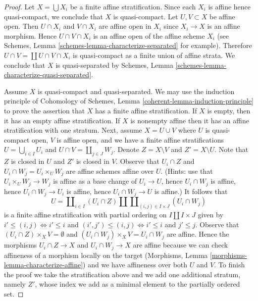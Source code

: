 \begin{proof}
Let $X = \bigcup X_i$ be a finite affine stratification. Since each $X_i$
is affine hence quasi-compact, we conclude that $X$ is quasi-compact.
Let $U, V \subset X$ be affine open. Then $U \cap X_i$ and $V \cap X_i$
are affine open in $X_i$ since $X_i \to X$ is an affine morphism. Hence
$U \cap V \cap X_i$ is an affine open of the affine scheme $X_i$ (see
Schemes, Lemma \ref{schemes-lemma-characterize-separated} for example).
Therefore $U \cap V = \coprod U \cap V \cap X_i$ is quasi-compact
as a finite union of affine strata. We conclude that $X$ is
quasi-separated by Schemes, Lemma
\ref{schemes-lemma-characterize-quasi-separated}.

\medskip\noindent
Assume $X$ is quasi-compact and quasi-separated. We may use the
induction principle of
Cohomology of Schemes, Lemma \ref{coherent-lemma-induction-principle}
to prove the assertion that $X$ has a finite affine stratification.
If $X$ is empty, then it has an empty affine stratification.
If $X$ is nonempty affine then it has an affine stratification
with one stratum. Next, assume $X = U \cup V$ where $U$ is quasi-compact open,
$V$ is affine open, and we have a finite affine stratifications
$U = \bigcup_{i \in I} U_i$ and $U \cap V = \coprod_{j \in J} W_j$.
Denote $Z = X \setminus V$ and $Z' = X \setminus U$.
Note that $Z$ is closed in $U$ and $Z'$ is closed in $V$.
Observe that $U_i \cap Z$ and $U_i \cap W_j = U_i \times_U W_j$ are affine
schemes affine over $U$. (Hints: use that $U_i \times_U W_j \to W_j$ is
affine as a base change of $U_i \to U$, hence $U_i \cap W_j$ is affine,
hence $U_i \cap W_j \to U_i$ is affine, hence $U_i \cap W_j \to U$ is affine.)
It follows that
$$
U = \coprod\nolimits_{i \in I} (U_i \cap Z) \amalg
\coprod\nolimits_{(i, j) \in I \times J} (U_i \cap W_j)
$$
is a finite affine stratification with partial ordering on
$I \amalg I \times J$ given by $i' \leq (i, j) \Leftrightarrow i' \leq i$
and $(i', j') \leq (i, j) \Leftrightarrow i' \leq i$ and $j' \leq j$.
Observe that $(U_i \cap Z) \times_X V = \emptyset$ and
$(U_i \cap W_j) \times_X V = U_i \cap W_j$ are affine.
Hence the morphisms $U_i \cap Z \to X$ and $U_i \cap W_j \to X$
are affine because we can check affineness of a morphism
locally on the target
(Morphisms, Lemma \ref{morphisms-lemma-characterize-affine})
and we have affineness over both $U$ and $V$.
To finish the proof we take the stratification above
and we add one additional stratum, namely $Z'$,
whose index we add as a minimal element to the partially ordered set.
\end{proof}

